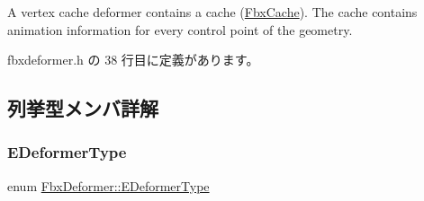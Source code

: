 A vertex cache deformer contains a cache (\hyperlink{class_fbx_cache}{Fbx\+Cache}). The cache contains animation information for every control point of the geometry. 

 fbxdeformer.\+h の 38 行目に定義があります。



\subsection{列挙型メンバ詳解}
\mbox{\label{class_fbx_deformer_a07e2cfb767191ba5c8799fdfbfe3eaf6}} 
\subsubsection{\texorpdfstring{E\+Deformer\+Type}{EDeformerType}}
{\footnotesize\ttfamily enum \hyperlink{class_fbx_deformer_a07e2cfb767191ba5c8799fdfbfe3eaf6}{Fbx\+Deformer\+::\+E\+Deformer\+Type}}

